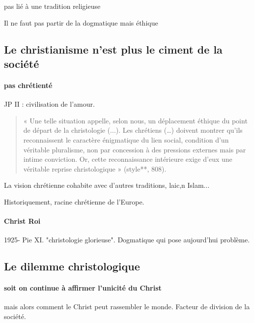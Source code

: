 \begin{Def}
  pas lié à une tradition religieuse  
\end{Def}

Il ne faut pas partir de la dogmatique mais éthique

\subsection{Le christianisme n’est plus le ciment de la société}

\paragraph{pas chrétienté} JP II : civilisation de l'amour.

\begin{quote}
    « Une telle situation appelle, selon nous, un déplacement éthique du point de départ de la christologie (...). Les chrétiens (…) doivent montrer qu’ils reconnaissent le caractère énigmatique du lien social, condition d’un véritable pluralisme, non par concession à des pressions externes mais par intime conviction. Or, cette reconnaissance intérieure exige d’eux une véritable reprise christologique » (style**, 808).
\end{quote}


La vision chrétienne cohabite avec d'autres traditions, laic,n Islam...
\begin{Ex}
Historiquement, racine chrétienne de l'Europe.   
\end{Ex}

\paragraph{Christ Roi} 1925- Pie XI. "christologie glorieuse". Dogmatique qui pose aujourd'hui problème.
 \subsection{Le dilemme christologique}
 

\paragraph{soit on continue à affirmer l'unicité du Christ} mais alors comment le Christ peut rassembler le monde. Facteur de division de la société.

